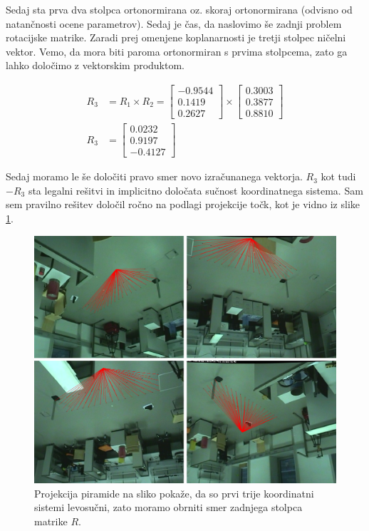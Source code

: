 \documentclass[a4paper, 12pt]{book}
\begin{document}
Sedaj sta prva dva stolpca ortonormirana oz. skoraj ortonormirana (odvisno od natančnosti ocene parametrov). Sedaj je čas, da naslovimo še zadnji problem rotacijske matrike. Zaradi prej omenjene koplanarnosti je tretji stolpec ničelni vektor. Vemo, da mora biti paroma ortonormiran s prvima stolpcema, zato ga lahko določimo z vektorskim produktom.

\begin{align}
R_3 &= R_1 \times R_2 =
\begin{bmatrix}
-0.9544 \\
0.1419 \\
0.2627
\end{bmatrix}
\times
\begin{bmatrix}
0.3003 \\
0.3877 \\
0.8810
\end{bmatrix} \\
R_3 &= 
\begin{bmatrix}
0.0232 \\
0.9197 \\
-0.4127
\end{bmatrix}
\end{align}

Sedaj moramo le še določiti pravo smer novo izračunanega vektorja. $R_3$ kot tudi $-R_3$ sta legalni rešitvi in implicitno določata sučnost koordinatnega sistema. Sam sem pravilno rešitev določil ročno na podlagi projekcije točk, kot je vidno iz slike \ref{reprojectionwrongimg}.

\begin{figure}[H]
\centering
\includegraphics[scale=0.25]{reprojection_wrong.png}
\caption{Projekcija piramide na sliko pokaže, da so prvi trije koordinatni sistemi levosučni, zato moramo obrniti smer zadnjega stolpca matrike $R$.}
\label{reprojectionwrongimg}
\end{figure}
\end{document}
